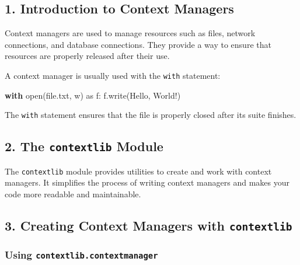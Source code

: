 \documentclass[
  letterpaper,
  DIV=11,
  numbers=noendperiod]{scrreprt}
\newenvironment{Shaded}{\begin{snugshade}}{\end{snugshade}}
\newcommand{\BuiltInTok}[1]{\textcolor[rgb]{0.00,0.23,0.31}{#1}}
\newcommand{\ControlFlowTok}[1]{\textcolor[rgb]{0.00,0.23,0.31}{\textbf{#1}}}
\newcommand{\ImportTok}[1]{\textcolor[rgb]{0.00,0.46,0.62}{#1}}
\newcommand{\NormalTok}[1]{\textcolor[rgb]{0.00,0.23,0.31}{#1}}
\newcommand{\StringTok}[1]{\textcolor[rgb]{0.13,0.47,0.30}{#1}}
\begin{document}
\subsection{1. Introduction to Context
Managers}\label{introduction-to-context-managers}

Context managers are used to manage resources such as files, network
connections, and database connections. They provide a way to ensure that
resources are properly released after their use.

A context manager is usually used with the \texttt{with} statement:

\begin{Shaded}
\begin{Highlighting}[]
\ControlFlowTok{with} \BuiltInTok{open}\NormalTok{(}\StringTok{\textquotesingle{}file.txt\textquotesingle{}}\NormalTok{, }\StringTok{\textquotesingle{}w\textquotesingle{}}\NormalTok{) }\ImportTok{as}\NormalTok{ f:}
\NormalTok{    f.write(}\StringTok{\textquotesingle{}Hello, World!\textquotesingle{}}\NormalTok{)}
\end{Highlighting}
\end{Shaded}

The \texttt{with} statement ensures that the file is properly closed
after its suite finishes.

\subsection{\texorpdfstring{2. The \texttt{contextlib}
Module}{2. The contextlib Module}}\label{the-contextlib-module}

The \texttt{contextlib} module provides utilities to create and work
with context managers. It simplifies the process of writing context
managers and makes your code more readable and maintainable.

\subsection{\texorpdfstring{3. Creating Context Managers with
\texttt{contextlib}}{3. Creating Context Managers with contextlib}}\label{creating-context-managers-with-contextlib}

\subsubsection{\texorpdfstring{Using
\texttt{contextlib.contextmanager}}{Using contextlib.contextmanager}}\label{using-contextlib.contextmanager}
\end{document}
